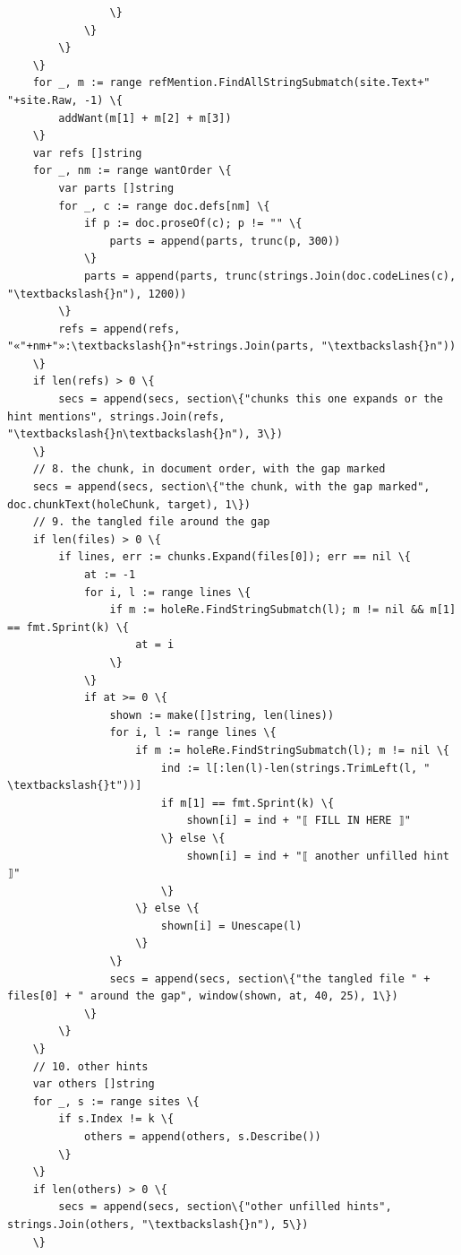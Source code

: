 \documentclass[10pt,a4paper]{article}
\newcounter{chunk}
\begin{document}
\begin{Verbatim}
				\}
			\}
		\}
	\}
	for _, m := range refMention.FindAllStringSubmatch(site.Text+" "+site.Raw, -1) \{
		addWant(m[1] + m[2] + m[3])
	\}
	var refs []string
	for _, nm := range wantOrder \{
		var parts []string
		for _, c := range doc.defs[nm] \{
			if p := doc.proseOf(c); p != "" \{
				parts = append(parts, trunc(p, 300))
			\}
			parts = append(parts, trunc(strings.Join(doc.codeLines(c), "\textbackslash{}n"), 1200))
		\}
		refs = append(refs, "«"+nm+"»:\textbackslash{}n"+strings.Join(parts, "\textbackslash{}n"))
	\}
	if len(refs) > 0 \{
		secs = append(secs, section\{"chunks this one expands or the hint mentions", strings.Join(refs, "\textbackslash{}n\textbackslash{}n"), 3\})
	\}
	// 8. the chunk, in document order, with the gap marked
	secs = append(secs, section\{"the chunk, with the gap marked", doc.chunkText(holeChunk, target), 1\})
	// 9. the tangled file around the gap
	if len(files) > 0 \{
		if lines, err := chunks.Expand(files[0]); err == nil \{
			at := -1
			for i, l := range lines \{
				if m := holeRe.FindStringSubmatch(l); m != nil && m[1] == fmt.Sprint(k) \{
					at = i
				\}
			\}
			if at >= 0 \{
				shown := make([]string, len(lines))
				for i, l := range lines \{
					if m := holeRe.FindStringSubmatch(l); m != nil \{
						ind := l[:len(l)-len(strings.TrimLeft(l, " \textbackslash{}t"))]
						if m[1] == fmt.Sprint(k) \{
							shown[i] = ind + "⟦ FILL IN HERE ⟧"
						\} else \{
							shown[i] = ind + "⟦ another unfilled hint ⟧"
						\}
					\} else \{
						shown[i] = Unescape(l)
					\}
				\}
				secs = append(secs, section\{"the tangled file " + files[0] + " around the gap", window(shown, at, 40, 25), 1\})
			\}
		\}
	\}
	// 10. other hints
	var others []string
	for _, s := range sites \{
		if s.Index != k \{
			others = append(others, s.Describe())
		\}
	\}
	if len(others) > 0 \{
		secs = append(secs, section\{"other unfilled hints", strings.Join(others, "\textbackslash{}n"), 5\})
	\}


\end{Verbatim}
\end{document}
